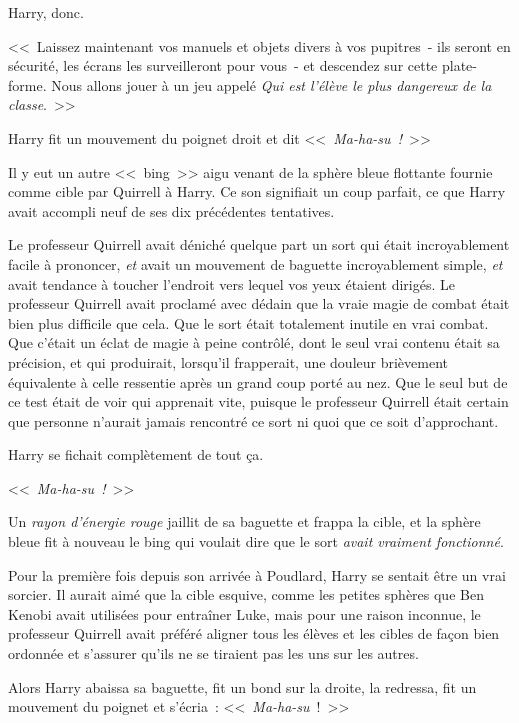 Harry, donc.

<<~Laissez maintenant vos manuels et objets divers à vos pupitres~- ils seront en sécurité, les écrans les surveilleront pour vous~- et descendez sur cette plate-forme. Nous allons jouer à un jeu appelé \emph{Qui est l'élève le plus dangereux de la classe}.~>>

\later

Harry fit un mouvement du poignet droit et dit <<~\emph{Ma-ha-su~!}~>>

Il y eut un autre <<~bing~>> aigu venant de la sphère bleue flottante fournie comme cible par Quirrell à Harry. Ce son signifiait un coup parfait, ce que Harry avait accompli neuf de ses dix précédentes tentatives.

Le professeur Quirrell avait déniché quelque part un sort qui était incroyablement facile à prononcer, \emph{et} avait un mouvement de baguette incroyablement simple, \emph{et} avait tendance à toucher l'endroit vers lequel vos yeux étaient dirigés. Le professeur Quirrell avait proclamé avec dédain que la vraie magie de combat était bien plus difficile que cela. Que le sort était totalement inutile en vrai combat. Que c'était un éclat de magie à peine contrôlé, dont le seul vrai contenu était sa précision, et qui produirait, lorsqu'il frapperait, une douleur brièvement équivalente à celle ressentie après un grand coup porté au nez. Que le seul but de ce test était de voir qui apprenait vite, puisque le professeur Quirrell était certain que personne n'aurait jamais rencontré ce sort ni quoi que ce soit d'approchant.

Harry se fichait complètement de tout ça.

<<~\emph{Ma-ha-su~!}~>>

Un \emph{rayon d'énergie rouge} jaillit de sa baguette et frappa la cible, et la sphère bleue fit à nouveau le bing qui voulait dire que le sort \emph{avait vraiment fonctionné}.

Pour la première fois depuis son arrivée à Poudlard, Harry se sentait être un vrai sorcier. Il aurait aimé que la cible esquive, comme les petites sphères que Ben Kenobi avait utilisées pour entraîner Luke, mais pour une raison inconnue, le professeur Quirrell avait préféré aligner tous les élèves et les cibles de façon bien ordonnée et s'assurer qu'ils ne se tiraient pas les uns sur les autres.

Alors Harry abaissa sa baguette, fit un bond sur la droite, la redressa, fit un mouvement du poignet et s'écria~: <<~\emph{Ma-ha-su}~!~>>

